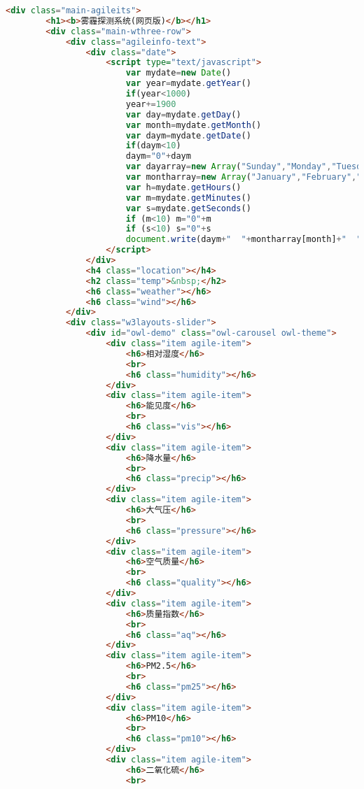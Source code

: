 \documentclass[12pt,AutoFakeBold]{article}
\begin{document}
\begin{appendices}
\begin{lstlisting}[language=html]
	<div class="main-agileits">
        <h1><b>雾霾探测系统(网页版)</b></h1>
		<div class="main-wthree-row"> 
			<div class="agileinfo-text"> 
				<div class="date">
				    <script type="text/javascript">
						var mydate=new Date()
						var year=mydate.getYear()
						if(year<1000)
						year+=1900
						var day=mydate.getDay()
						var month=mydate.getMonth()
						var daym=mydate.getDate()
						if(daym<10)
						daym="0"+daym
						var dayarray=new Array("Sunday","Monday","Tuesday","Wednesday","Thursday","Friday","Saturday")
						var montharray=new Array("January","February","March","April","May","June","July","August","September","October","November","December")
						var h=mydate.getHours()
                        var m=mydate.getMinutes()
                        var s=mydate.getSeconds()
                        if (m<10) m="0"+m
                        if (s<10) s="0"+s
                        document.write(daym+"  "+montharray[month]+"  "+year+" <br> "+dayarray[day] + " <br> " +h+":"+m)
                    </script>
				</div>
                <h4 class="location"></h4>
				<h2 class="temp">&nbsp;</h2>
				<h6 class="weather"></h6>
                <h6 class="wind"></h6>
			</div>
			<div class="w3layouts-slider">
				<div id="owl-demo" class="owl-carousel owl-theme">
                    <div class="item agile-item">
						<h6>相对湿度</h6>
                        <br>
						<h6 class="humidity"></h6>
					</div> 
                    <div class="item agile-item">
						<h6>能见度</h6>
                        <br>
						<h6 class="vis"></h6>
					</div> 
                    <div class="item agile-item">
						<h6>降水量</h6>
                        <br>
						<h6 class="precip"></h6>
					</div> 
                    <div class="item agile-item">
						<h6>大气压</h6>
                        <br>
						<h6 class="pressure"></h6>
					</div> 
					<div class="item agile-item">
						<h6>空气质量</h6>
                        <br>
						<h6 class="quality"></h6>
					</div> 
					<div class="item agile-item">
						<h6>质量指数</h6>
                        <br>
						<h6 class="aq"></h6>
					</div> 
					<div class="item agile-item">
                        <h6>PM2.5</h6>
                        <br>
						<h6 class="pm25"></h6>
					</div>  
                    <div class="item agile-item">
                        <h6>PM10</h6>
                        <br>
						<h6 class="pm10"></h6>
					</div>  
					<div class="item agile-item">
                        <h6>二氧化硫</h6>
                        <br>

\end{lstlisting}
\end{appendices}
\end{document}
